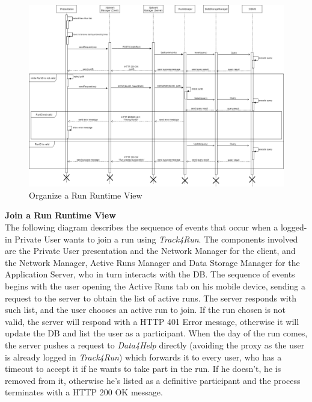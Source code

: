 \documentclass[titlepage]{article}
\begin{document}
\begin{figure}[H]
	\center
  	\includegraphics[width=15cm]{Organize.png}
  	\caption{Organize a Run Runtime View}
 	\label{fig:ORG}
\end{figure}
\noindent
{\bf Join a Run Runtime View }\\ 
The following diagram describes the sequence of events that occur when a logged-in Private User wants to join a run using {\it Track4Run}.
The components involved are the Private User presentation and the Network Manager for the client, and the Network Manager, Active Runs Manager and Data Storage Manager for the Application Server, who in turn interacts with the DB.
The sequence of events begins with the user opening the Active Runs tab on his mobile device, sending a request to the server to obtain the list of active runs. The server responds with such list, and the user chooses an active run to join. If the run chosen is not valid, the server will respond with a HTTP 401 Error message, otherwise it will update the DB and list the user as a participant.
When the day of the run comes, the server pushes a request to {\it Data4Help} directly (avoiding the proxy as the user is already logged in {\it Track4Run}) which forwards it to every user, who has a timeout to accept it if he wants to take part in the run. If he doesn’t, he is removed from it, otherwise he’s listed as a definitive participant and the process terminates with a HTTP 200 OK message.
\end{document}
